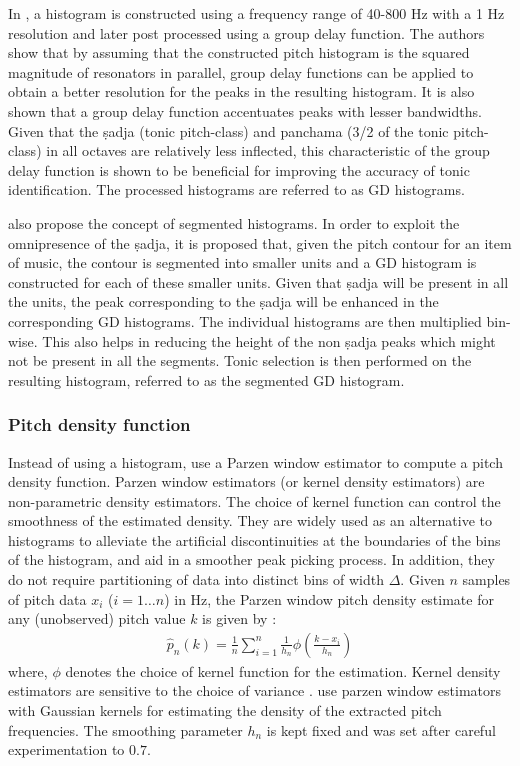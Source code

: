 {In \cite{Ashwin_Istanbul2012}, a histogram is constructed using a frequency
range of 40-800 Hz with a 1 Hz resolution and later post processed using a group
delay function. The authors show that by assuming that the constructed
pitch histogram is the squared magnitude of resonators in parallel, group
delay functions can be applied to obtain a better resolution for the peaks in
the resulting histogram. It is also shown that a group delay function
accentuates peaks with lesser bandwidths. Given that the ṣadja (tonic
pitch-class) and panchama (3/2 of the tonic pitch-class) in all octaves are
relatively less inflected, this characteristic of the group delay function is
shown to be beneficial for improving the accuracy of tonic identification. The
processed histograms are referred to as GD histograms.

 also propose the concept of segmented histograms. In
order to exploit the omnipresence of the ṣadja,  it is proposed that, given the
pitch contour for an item of music, the contour is segmented into smaller units
and a GD histogram is constructed for each of these smaller units. Given that
ṣadja will be present in all the units, the peak corresponding to the ṣadja will
be enhanced in the corresponding GD histograms. The individual histograms are
then multiplied bin-wise. This also helps in reducing the height of the non ṣadja
peaks which might not be present in all the segments. Tonic selection is then
performed on the resulting histogram, referred to as the segmented GD histogram.



\subsubsection{Pitch density function}
\label{Pitch density function}

Instead of using a histogram,  use a Parzen window estimator
to compute a pitch density function.
%
Parzen window estimators (or kernel density estimators) are non-parametric
density estimators. The choice of kernel function can control the smoothness of the
estimated density. They are widely used as an alternative to histograms to
alleviate the artificial discontinuities at the boundaries of the bins of the
histogram, and aid in a smoother peak picking process. In addition,
they do not require partitioning of data into distinct bins of width $\Delta$.
Given $n$ samples of pitch data $x_i$ ($i=1\ldots{}n$) in Hz, the Parzen window
pitch density estimate for any (unobserved) pitch value $k$ is given by
\cite{DudaHart2000}:
\begin{eqnarray}
	\hat p_n(k) = \frac{1}{n} \sum_{i=1}^{n}
	\frac{1}{h_n}\phi\left(\frac{k-x_i}{h_n}\right)
\end{eqnarray}
where, $\phi$ denotes the choice of kernel function for the estimation. Kernel
density estimators are sensitive to the choice of variance \cite{Bishop,
	DudaHart2000}.  use parzen window estimators with Gaussian
kernels for estimating the density of the extracted pitch frequencies. The
smoothing parameter $h_n$ is kept fixed and was set after careful
experimentation to $0.7$.


}
